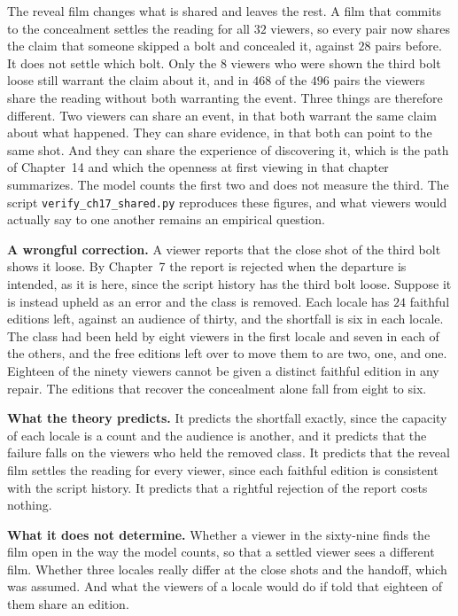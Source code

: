 \documentclass[11pt,twoside,openright]{book}
\theoremstyle{plain}
\theoremstyle{definition}
\theoremstyle{remark}
\begin{document}
The reveal film changes what is shared and leaves the rest. A film that commits to the concealment settles the reading for all $32$ viewers, so every pair now shares the claim that someone skipped a bolt and concealed it, against $28$ pairs before. It does not settle which bolt. Only the $8$ viewers who were shown the third bolt loose still warrant the claim about it, and in $468$ of the $496$ pairs the viewers share the reading without both warranting the event. Three things are therefore different. Two viewers can share an event, in that both warrant the same claim about what happened. They can share evidence, in that both can point to the same shot. And they can share the experience of discovering it, which is the path of Chapter~14 and which the openness at first viewing in that chapter summarizes. The model counts the first two and does not measure the third. The script \texttt{verify\_ch17\_shared.py} reproduces these figures, and what viewers would actually say to one another remains an empirical question.

\textbf{A wrongful correction.} A viewer reports that the close shot of the third bolt shows it loose. By Chapter~7 the report is rejected when the departure is intended, as it is here, since the script history has the third bolt loose. Suppose it is instead upheld as an error and the class is removed. Each locale has $24$ faithful editions left, against an audience of thirty, and the shortfall is six in each locale. The class had been held by eight viewers in the first locale and seven in each of the others, and the free editions left over to move them to are two, one, and one. Eighteen of the ninety viewers cannot be given a distinct faithful edition in any repair. The editions that recover the concealment alone fall from eight to six.

\textbf{What the theory predicts.} It predicts the shortfall exactly, since the capacity of each locale is a count and the audience is another, and it predicts that the failure falls on the viewers who held the removed class. It predicts that the reveal film settles the reading for every viewer, since each faithful edition is consistent with the script history. It predicts that a rightful rejection of the report costs nothing.

\textbf{What it does not determine.} Whether a viewer in the sixty-nine finds the film open in the way the model counts, so that a settled viewer sees a different film. Whether three locales really differ at the close shots and the handoff, which was assumed. And what the viewers of a locale would do if told that eighteen of them share an edition.
\end{document}
